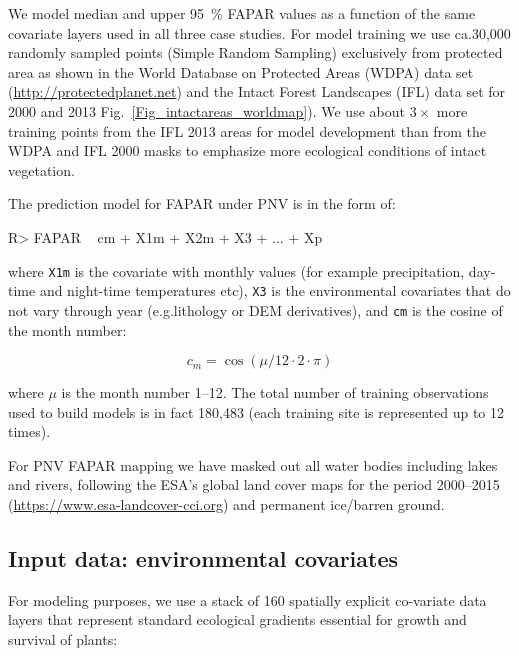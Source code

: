 \documentclass[fleqn,10pt,lineno]{wlpeerj} %
\begin{document}
We model median and upper \SI{95}{\percent} FAPAR values as a function of the same covariate layers used in all three case studies. For model training we use ca.\@ 30,000 randomly sampled points (Simple Random Sampling) exclusively from protected area as shown in the World Database on Protected Areas (WDPA) data set (\url{http://protectedplanet.net}) and the Intact Forest Landscapes (IFL) data set for 2000 and 2013 \citep{potapov2008mapping} Fig.\@~\ref{Fig_intactareas_worldmap}). We use about $3\times$ more training points from the IFL 2013 areas for model development than from the WDPA and IFL 2000 masks to emphasize more ecological conditions of intact vegetation.\par 

The prediction model for FAPAR under PNV is in the form of: 

\begin{Schunk}
\begin{Sinput}
R> FAPAR ~ cm + X1m + X2m + X3 + ... + Xp
\end{Sinput}
\end{Schunk}

\noindent where \verb"X1m" is the covariate with monthly values (for example precipitation, day-time and night-time temperatures etc), \verb"X3" is the environmental covariates that do not vary through year (e.g.\@ lithology or DEM derivatives), and \verb"cm" is the cosine of the month number:

\begin{equation}
c_m = \cos \left( \mu /12 \cdot 2 \cdot \pi \right)
\end{equation}

\noindent where $\mu$ is the month number 1--12. The total number of training observations used to build models is in fact 180,483 (each training site is represented up to 12 times).\par

For PNV FAPAR mapping we have masked out all water bodies including lakes and rivers, following the ESA's global land cover maps for the period 2000--2015 (\url{https://www.esa-landcover-cci.org}) and permanent ice/barren ground.\par

\subsection*{Input data: environmental covariates}

For modeling purposes, we use a stack of 160 spatially explicit co-variate data layers that represent standard ecological gradients essential for growth and survival of plants:
\end{document}
